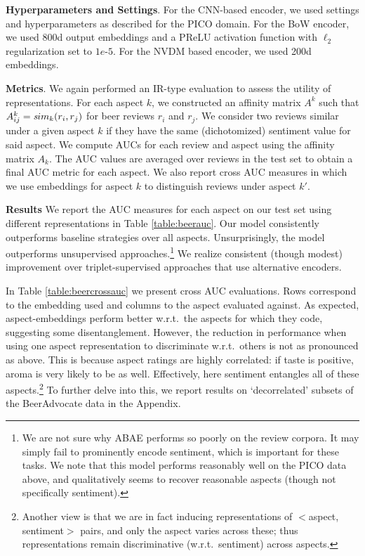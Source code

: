 \documentclass[11pt,a4paper]{article}
\begin{document}
\vspace{.25em}
\noindent  \textbf{Hyperparameters and Settings}. For the CNN-based encoder, we used settings and hyperparameters as described for the PICO domain. For the BoW encoder, we used 800d output embeddings and a PReLU activation function with $\ell_2$ regularization set to $1e$-$5$. For the NVDM based encoder, we used 200d embeddings. %

\vspace{.25em}
\noindent \textbf{Metrics}. We again performed an IR-type evaluation to assess the utility of representations. For each aspect $k$, we constructed an affinity matrix $A^k$ such that $A^k_{ij} = {\textit sim}_k(r_i, r_j)$ for beer reviews $r_i$ and $r_j$. We consider two reviews similar under a given aspect $k$ if they have the same (dichotomized) sentiment value for said aspect. We compute AUCs for each review and aspect using the affinity matrix $A_k$. The AUC values are averaged over reviews in the test set to obtain a final AUC metric for each aspect. We also report cross AUC measures in which we use embeddings for aspect $k$ to distinguish reviews under aspect $k'$. %

\vspace{.25em}
\noindent \textbf{Results} We report the AUC measures for each aspect on our test set using different representations in Table \ref{table:beerauc}. Our model consistently outperforms baseline strategies over all aspects. Unsurprisingly, the model outperforms unsupervised approaches.\footnote{We are not sure why ABAE \cite{he-2017} performs so poorly on the review corpora. It may simply fail to prominently encode sentiment, which is important for these tasks. We note that this model performs reasonably well on the PICO data above, and qualitatively seems to recover reasonable aspects (though not specifically sentiment).} We realize consistent (though modest) improvement over triplet-supervised approaches that use alternative encoders. %

In Table \ref{table:beercrossauc} we present cross AUC evaluations. Rows correspond to the embedding used and columns to the aspect evaluated against. As expected, aspect-embeddings perform better w.r.t.~the aspects for which they code, suggesting some disentanglement. However, the reduction in performance when using one aspect representation to discriminate w.r.t.~others is not as pronounced as above. This is because aspect ratings are highly correlated: if taste is positive, aroma is very likely to be as well. Effectively, here sentiment entangles all of these aspects.\footnote{Another view is that we are in fact inducing representations of $<$aspect, sentiment$>$ pairs, and only the aspect varies across these; thus representations remain discriminative (w.r.t.~sentiment) across aspects.} To further delve into this, we report results on `decorrelated' subsets of the BeerAdvocate data in the Appendix. 
\end{document}
